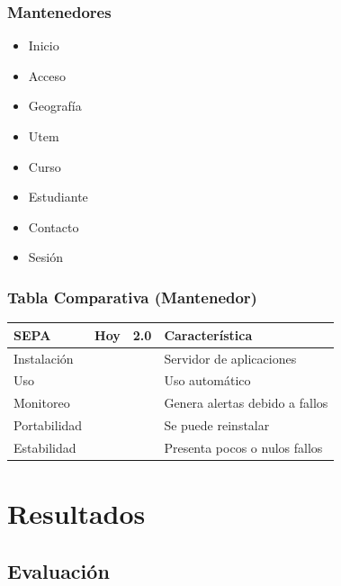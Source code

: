 \documentclass{beamer}
\newcommand{\cmark}{\ding{51}}%
\newcommand{\xmark}{\ding{55}}%
\begin{document}

\begin{frame}
\frametitle{Mantenedores}
\begin{itemize}
\item Inicio
\item Acceso
\item Geografía
\item Utem
\item Curso
\item Estudiante
\item Contacto
\item Sesión
\end{itemize}
\end{frame}


\begin{frame}
\frametitle{Tabla Comparativa (Mantenedor)}
\begin{table}
\begin{tabular}{l l l l}
\toprule
\textbf{SEPA} & \textbf{Hoy} & \textbf{2.0} & Característica\\
\midrule
Instalación 	& \textcolor{green}{\cmark} & \textcolor{green}{\cmark} & Servidor de aplicaciones  \\
Uso		 		& \textcolor{green}{\cmark} & \textcolor{green}{\cmark} & Uso automático \\
Monitoreo 		& \textcolor{red}{\xmark}   & \textcolor{green}{\cmark} & Genera alertas debido a fallos \\
Portabilidad 	& \textcolor{red}{\xmark}   & \textcolor{green}{\cmark} & Se puede reinstalar \\
Estabilidad 	& \textcolor{red}{\xmark}   & \textcolor{green}{\cmark} & Presenta pocos o nulos fallos \\
\bottomrule
\end{tabular}
\end{table}
\end{frame}


\section{Resultados} 

\subsection{Evaluación}
\end{document}
